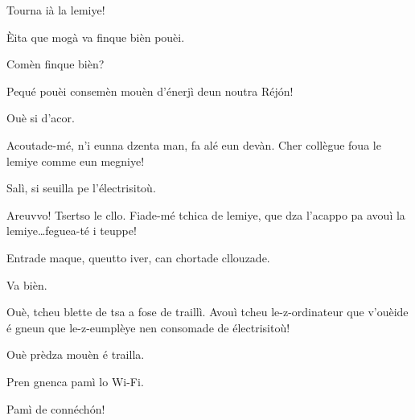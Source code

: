 \begin{drama}

{}


\vspace*{-3pt}
\vspace*{-3pt}

\Tuenospeaks Tourna ià la lemiye!

\Richardspeaks \`Eita que mogà va finque bièn pouèi.

\Tuenospeaks Comèn finque bièn?

\Richardspeaks Pequé pouèi consemèn  mouèn d'énerjì deun noutra Réj\'on!

\Gerominespeaks Ouè si d'acor.

\Richardspeaks Acoutade-mé, n'i eunna dzenta man, fa alé eun devàn. Cher collègue \og foua le lemiye comme eun megniye\fg ! 


\Elettricistaspeaks{} Salì, si seuilla pe l'électrisitoù.

\Sandrinospeaks Areuvvo! Tsertso le cllo. Fiade-mé tchica de lemiye, que dza l'acappo pa avouì la lemiye\ldots feguea-té i teuppe!


\Sandrinospeaks Entrade maque, queutto iver, can chortade cllou\-za\-de.

\Elettricistaspeaks Va bièn.


\Elettricistaspeaks{} Ouè, tcheu blette de tsa a fose de traillì. Avouì tcheu le-z-ordinateur que v'ouèide é gneun que le-z-eumplèye nen consomade de électrisitoù! 

\Saventaspeaks{} Ouè prèdza mouèn é trailla.

\Gerominespeaks Pren gnenca pamì lo Wi-Fi.

\Saventaspeaks Pamì de connéch\'on!



\end{drama}
